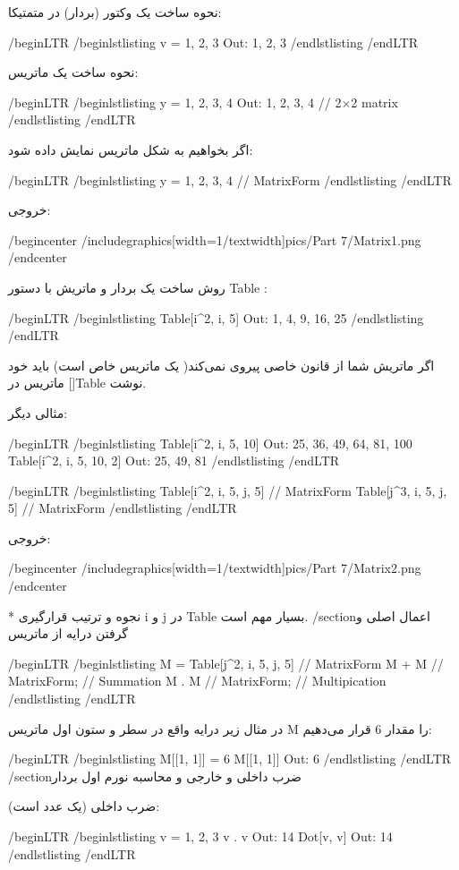 نحوه ساخت یک وکتور (بردار) در متمتیکا:

/begin{LTR}
/begin{lstlisting}
v = {1, 2, 3}         Out: {1, 2, 3}
/end{lstlisting}
/end{LTR}

نحوه ساخت یک ماتریس:

/begin{LTR}
/begin{lstlisting}
y = {{1, 2}, {3, 4}}    Out: {{1, 2}, {3, 4}}      // 2×2 matrix
/end{lstlisting}
/end{LTR}

اگر بخواهیم به شکل ماتریس نمایش داده شود:

/begin{LTR}
/begin{lstlisting}
y = {{1, 2}, {3, 4}} // MatrixForm
/end{lstlisting}
/end{LTR}

خروجی:

/begin{center}
/includegraphics[width=1/textwidth]{pics/Part 7/Matrix1.png}
/end{center}

روش ساخت یک بردار و ماتریش با دستور Table :

/begin{LTR}
/begin{lstlisting}
Table[i^2, {i, 5}]    Out: {1, 4, 9, 16, 25}
/end{lstlisting}
/end{LTR}

اگر ماتریش شما از قانون خاصی پیروی نمی‌کند( یک ماتریس خاص است) باید خود ماتریس در []Table نوشت.

مثالی دیگر:

/begin{LTR}
/begin{lstlisting}
Table[i^2, {i, 5, 10}]            Out: {25, 36, 49, 64, 81, 100}
Table[i^2, {i, 5, 10, 2}]      Out: {25, 49, 81}
/end{lstlisting}
/end{LTR}

/begin{LTR}
/begin{lstlisting}
Table[i^2, {i, 5}, {j, 5}] // MatrixForm
Table[j^3, {i, 5}, {j, 5}] // MatrixForm
/end{lstlisting}
/end{LTR}

خروجی:

/begin{center}
/includegraphics[width=1/textwidth]{pics/Part 7/Matrix2.png}
/end{center}

* نجوه و ترتیب قرارگیری i و j در Table بسیار مهم است.
/section{اعمال اصلی و گرفتن درایه از ماتریس}

/begin{LTR}
/begin{lstlisting}
M = Table[j^2, {i, 5}, {j, 5}] // MatrixForm
M + M // MatrixForm;               // Summation
M . M // MatrixForm;               // Multipication
/end{lstlisting}
/end{LTR}

در مثال زیر درایه واقع در سطر و ستون اول ماتریس M را مقدار 6 قرار می‌دهیم:

/begin{LTR}
/begin{lstlisting}
M[[1, 1]] = 6
M[[1, 1]]               Out: 6
/end{lstlisting}
/end{LTR}
/section{ضرب داخلی و خارجی و محاسبه نورم اول بردار}

ضرب داخلی (یک عدد است):

/begin{LTR}
/begin{lstlisting}
v = {1, 2, 3}             
v . v            Out: 14
Dot[v, v]     Out: 14
/end{lstlisting}
/end{LTR}

